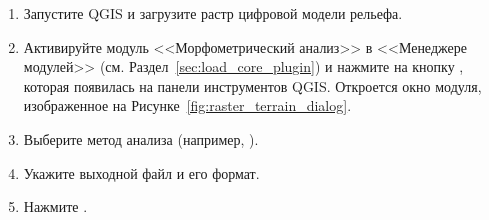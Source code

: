 \label{raster_terrain_usage}

\begin{enumerate}
  \item Запустите QGIS и загрузите растр цифровой модели рельефа.
  \item Активируйте модуль <<Морфометрический анализ>> в <<Менеджере модулей>>
  (см. Раздел~\ref{sec:load_core_plugin}) и нажмите на кнопку
  , которая появилась
  на панели инструментов QGIS. Откроется окно модуля, изображенное на
  Рисунке~\ref{fig:raster_terrain_dialog}.
  \item Выберите метод анализа (например, ).
  \item Укажите выходной файл и его формат.
  \item Нажмите .
\end{enumerate}

\FloatBarrier

